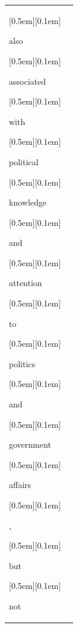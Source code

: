 \begin{table}[ht]
\begin{tabular}{@{}l p{13cm}@{}}
{\setlength{\fboxsep}{1pt}\raisebox{0pt}[0.5em][0.1em]{\colorbox{Salmon!60}{\strut{ also}}}}{\setlength{\fboxsep}{1pt}\raisebox{0pt}[0.5em][0.1em]{\colorbox{DarkOrchid!25}{\strut{ associated}}}}{\setlength{\fboxsep}{1pt}\raisebox{0pt}[0.5em][0.1em]{\colorbox{SkyBlue!55}{\strut{ with}}}}{\setlength{\fboxsep}{1pt}\raisebox{0pt}[0.5em][0.1em]{\colorbox{Salmon!60}{\strut{ political}}}}{\setlength{\fboxsep}{1pt}\raisebox{0pt}[0.5em][0.1em]{\colorbox{Salmon!60}{\strut{ knowledge}}}}{\setlength{\fboxsep}{1pt}\raisebox{0pt}[0.5em][0.1em]{\colorbox{SkyBlue!55}{\strut{ and}}}}{\setlength{\fboxsep}{1pt}\raisebox{0pt}[0.5em][0.1em]{\colorbox{Salmon!60}{\strut{ attention}}}}{\setlength{\fboxsep}{1pt}\raisebox{0pt}[0.5em][0.1em]{\colorbox{Salmon!60}{\strut{ to}}}}{\setlength{\fboxsep}{1pt}\raisebox{0pt}[0.5em][0.1em]{\colorbox{Salmon!60}{\strut{ politics}}}}{\setlength{\fboxsep}{1pt}\raisebox{0pt}[0.5em][0.1em]{\colorbox{SkyBlue!55}{\strut{ and}}}}{\setlength{\fboxsep}{1pt}\raisebox{0pt}[0.5em][0.1em]{\colorbox{Salmon!60}{\strut{ government}}}}{\setlength{\fboxsep}{1pt}\raisebox{0pt}[0.5em][0.1em]{\colorbox{DarkOrchid!25}{\strut{ affairs}}}}{\setlength{\fboxsep}{1pt}\raisebox{0pt}[0.5em][0.1em]{\colorbox{SkyBlue!55}{\strut{,}}}}{\setlength{\fboxsep}{1pt}\raisebox{0pt}[0.5em][0.1em]{\colorbox{SkyBlue!55}{\strut{ but}}}}{\setlength{\fboxsep}{1pt}\raisebox{0pt}[0.5em][0.1em]{\colorbox{Salmon!60}{\strut{ not}}}}\\



\end{tabular}
\end{table}
